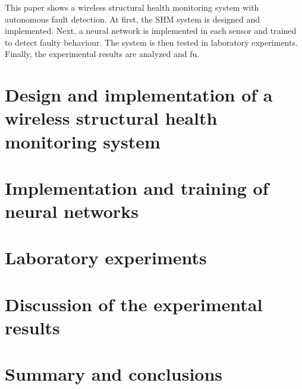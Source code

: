 \documentclass[12pt]{article}
\begin{document}

This paper shows a wireless structural health monitoring system with autonomous fault detection. 
At first, the SHM system is designed and implemented. 
Next, a neural network is implemented in each sensor and trained to detect faulty behaviour. 
The system is then tested in laboratory experiments. 
Finally, the experimental results are analyzed and fu.

\section*{Design and implementation of a wireless structural health monitoring system}


\section*{Implementation and training of neural networks}



\section*{Laboratory experiments}

\section*{Discussion of the experimental results}

\section*{Summary and conclusions}



\end{document}
